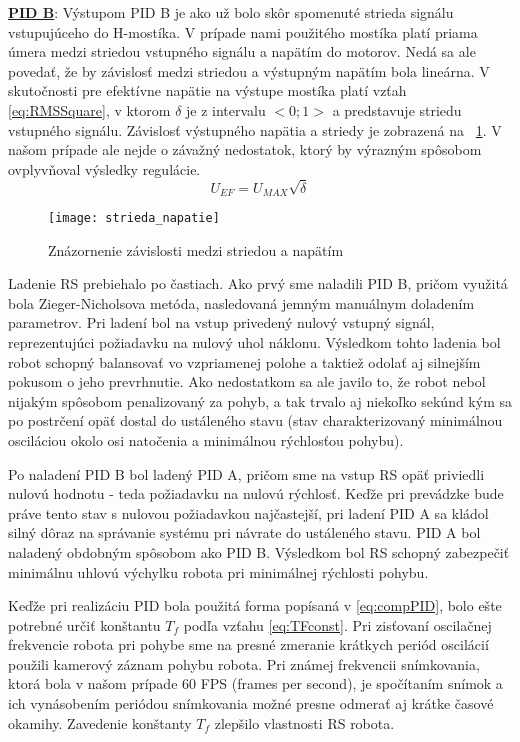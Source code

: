 \underline{\textbf{PID B}}:
Výstupom PID B je ako už bolo skôr spomenuté strieda signálu vstupujúceho do H-mostíka. V prípade nami použitého mostíka platí priama úmera medzi striedou vstupného signálu a napätím do motorov. Nedá sa ale povedať, že by závislosť medzi striedou a výstupným napätím bola lineárna. V skutočnosti pre efektívne napätie na výstupe mostíka platí vzťah \eqref{eq:RMSSquare}, v ktorom $\delta$ je z intervalu $<0;1>$ a predstavuje striedu vstupného signálu. Závislosť výstupného napätia a striedy je zobrazená na \figurename~\ref{fig:strieda_napatie}. V našom prípade ale nejde o závažný nedostatok, ktorý by výrazným spôsobom ovplyvňoval výsledky regulácie.
\begin{equation}
U_{EF} = U_{MAX}\sqrt{\delta}
\label{eq:RMSSquare}
\end{equation}
\begin{figure}[h!]
\centering
\texttt{[image: strieda\_napatie]}
\caption{Znázornenie závislosti medzi striedou a napätím}
\label{fig:strieda_napatie}
\end{figure}
Ladenie \ac{RS} prebiehalo po častiach. Ako prvý sme naladili PID B, pričom využitá bola Zieger-Nicholsova metóda, nasledovaná jemným manuálnym doladením parametrov. Pri ladení bol na vstup privedený nulový vstupný signál, reprezentujúci požiadavku na nulový uhol náklonu. Výsledkom tohto ladenia bol robot schopný balansovať vo vzpriamenej polohe a taktiež odolať aj silnejším pokusom o jeho prevrhnutie. Ako nedostatkom sa ale javilo to, že robot nebol nijakým spôsobom penalizovaný za pohyb, a tak trvalo aj niekoľko sekúnd kým sa po postrčení opäť dostal do ustáleného stavu (stav charakterizovaný minimálnou osciláciou okolo osi natočenia a minimálnou rýchlosťou pohybu).

Po naladení PID B bol ladený PID A, pričom sme na vstup RS opäť priviedli nulovú hodnotu - teda požiadavku na nulovú rýchlosť. Keďže pri prevádzke bude práve tento stav s nulovou požiadavkou najčastejší, pri ladení PID A sa kládol silný dôraz na správanie systému pri návrate do ustáleného stavu. PID A bol naladený obdobným spôsobom ako PID B. Výsledkom bol \ac{RS} schopný zabezpečiť minimálnu uhlovú výchylku robota pri minimálnej rýchlosti pohybu.

Keďže pri realizáciu PID bola použitá forma popísaná v \ref{eq:compPID}, bolo ešte potrebné určiť konštantu $T_f$ podľa vzťahu \ref{eq:TFconst}. Pri zisťovaní oscilačnej frekvencie robota pri pohybe sme na presné zmeranie krátkych periód oscilácií použili kamerový záznam pohybu robota. Pri známej frekvencii snímkovania, ktorá bola v našom prípade 60 \ac{FPS} (frames per second), je spočítaním snímok a ich vynásobením periódou snímkovania možné presne odmerať aj krátke časové okamihy. Zavedenie konštanty $T_f$ zlepšilo vlastnosti \ac{RS} robota.


